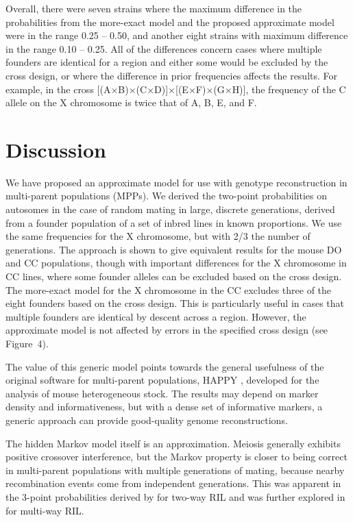 \documentclass[12pt,letterpaper]{article}\usepackage[]{graphicx}\usepackage[table]{xcolor}
\begin{document}
Overall, there were seven strains
where the maximum difference in the probabilities from the more-exact
model and the proposed approximate model were in the range
0.25 -- 0.50,
and another eight strains with maximum
difference in the range 0.10 -- 0.25. All of the differences concern
cases where multiple founders are identical for a region and either some would
be excluded by the cross design, or where the difference in prior
frequencies affects the results. For example, in the cross
[(A$\times$B)$\times$(C$\times$D)]$\times$[(E$\times$F)$\times$(G$\times$H)],
the frequency of the C allele on the X chromosome is twice that of A,
B, E, and F.










\clearpage
\section*{Discussion}


We have proposed an approximate model for use with genotype
reconstruction in multi-parent populations (MPPs). We derived the
two-point probabilities on autosomes in the case of random mating in
large, discrete generations, derived from a founder population of a
set of inbred lines in known proportions. We use the same frequencies
for the X chromosome, but with 2/3 the number of generations. The
approach is shown to give equivalent results for the mouse DO and CC
populations, though with important differences for the X chromosome in
CC lines, where some founder alleles can be excluded based on the
cross design. The more-exact model for the X chromosome in the CC
excludes three of the eight founders based on the cross design. This
is particularly useful in cases that multiple founders are identical
by descent across a region. However, the approximate model is not
affected by errors in the specified cross design (see Figure~4).

The value of this generic model points towards the general usefulness
of the original software for multi-parent populations, HAPPY
\citep{mott2000}, developed for the analysis of mouse heterogeneous
stock. The results may depend on marker density and informativeness,
but with a dense set of informative markers, a generic approach can
provide good-quality genome reconstructions.

The hidden Markov model itself is an approximation. Meiosis generally
exhibits positive crossover interference, but the Markov property is
closer to being correct in multi-parent populations with multiple
generations of mating, because nearby recombination events come from
independent generations. This was apparent in the
3-point probabilities derived by \citet{haldane1931} for two-way RIL
and was further explored in \citet{broman2005} for multi-way RIL.
\end{document}

